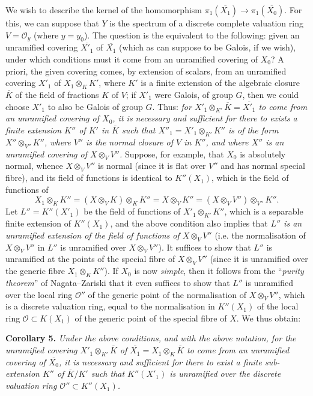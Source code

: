 \documentclass{article}
\newenvironment{itenv}[1]
  {\phantomsection\par\medskip\noindent\textbf{#1.}\itshape}
  {\par\medskip}
\newcommand{\scr}[1]{{\mathscr{#1}}}
\newcommand{\oldpage}[1]{\marginpar{\footnotesize$\Big\vert$ \textit{p.~#1}}}
\begin{document}
We wish to describe the kernel of the homomorphism $\pi_1(\overline{X_1})\to\pi_1(\overline{X_0})$.
For this, we can suppose that $Y$ is the spectrum of a discrete complete valuation ring $V=\scr{O}_y$ (where $y=y_0$).
The question is the equivalent to the following:
given an unramified covering $\overline{X'_1}$ of $\overline{X_1}$ (which as can suppose to be Galois, if we wish), under which conditions must it come from an unramified covering of $X_0$?
A priori, the given covering comes, by extension of scalars, from an unramified covering $X'_1$ of $X_1\otimes_KK'$, where $K'$ is a finite extension of the algebraic closure $\overline{K}$ of the field of fractions $K$ of $V$;
if $X'_1$ were Galois, of group $G$, then we could choose $X'_1$ to also be Galois of group $G$.
Thus: \emph{for $X'_1\otimes_{K'}\overline{K}=\overline{X'_1}$ to come from an unramified covering of $X_0$, it is necessary and sufficient for there to exists a finite extension $K''$ of $K'$ in $\overline{K}$ such that $X''_1=X'_1\otimes_{K'}K''$ is of the form $X''\otimes_{V''}K''$, where $V''$ is the normal closure of $V$ in $K''$, and where $X''$ is an unramified covering of $X\otimes_V V''$.}
Suppose, for example, that $X_0$ is absolutely normal, whence $X\otimes_V V''$ is normal (since it is flat over $V''$ and has normal special fibre), and its field of functions is identical to $K''(X_1)$, which is the field of functions of
\[
  X_1\otimes_K K'' = (X\otimes_VK)\otimes_KK'' = X\otimes_VK'' = (X\otimes_VV'')\otimes_{V''}K''.
\]
\oldpage{182-26}
Let $L''=K''(X'_1)$ be the field of functions of $X'_1\otimes_{K'}K''$, which is a separable finite extension of $K''(X_1)$, and the above condition also implies that \emph{$L''$ is an unramified extension of the field of functions of $X\otimes_VV''$} (i.e. the normalisation of $X\otimes_V V''$ in $L''$ is unramified over $X\otimes_VV''$).
It suffices to show that $L''$ is unramified at the points of the special fibre of $X\otimes_VV''$ (since it is unramified over the generic fibre $X_1\otimes_KK''$).
If $X_0$ is now \emph{simple}, then it follows from the ``\emph{purity theorem}'' of Nagata--Zariski that it even suffices to show that $L''$ is unramified over the local ring $\scr{O}''$ of the generic point of the normalisation of $X\otimes_VV''$, which is a discrete valuation ring, equal to the normalisation in $K''(X_1)$ of the local ring $\scr{O}\subset K(X_1)$ of the generic point of the special fibre of $X$.
We thus obtain:

\begin{itenv}{Corollary 5}
\label{theorem12corollary5}
  Under the above conditions, and with the above notation, for the unramified covering $X'_1\otimes_{K'}\overline{K}$ of $\overline{X_1}=X_1\otimes_K\overline{K}$ to come from an unramified covering of $\overline{X_0}$, it is necessary and sufficient for there to exist a finite sub-extension $K''$ of $\overline{K}/K'$ such that $K''(X'_1)$ is unramified over the discrete valuation ring $\scr{O}''\subset K''(X_1)$.
\end{itenv}
\end{document}
